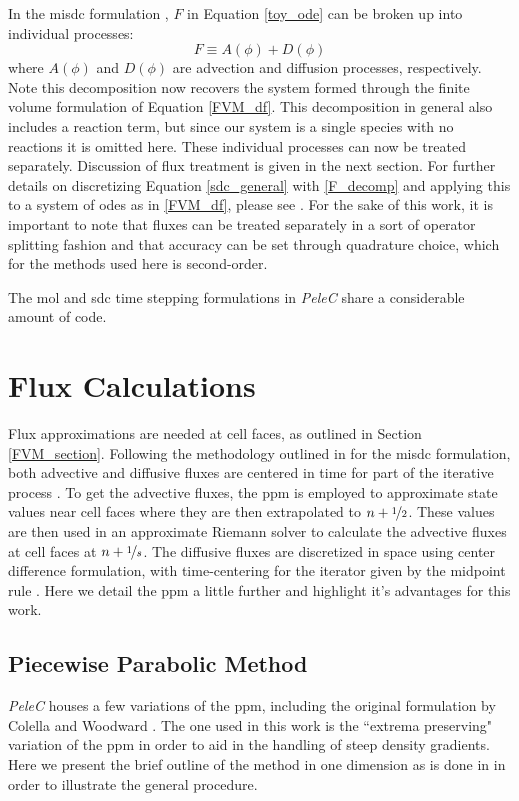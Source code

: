 In the \gls{misdc} formulation \cite{}, $F$ in Equation \ref{toy_ode} can be broken up into individual processes: 
\begin{equation} \label{F_decomp}
F \equiv A(\phi) + D(\phi)
\end{equation}
where $A(\phi)$ and $D(\phi)$ are advection and diffusion processes, respectively. Note this decomposition now recovers the system formed through the finite volume formulation of Equation \ref{FVM_df}. This decomposition in general also includes a reaction term, but since our system is a single species with no reactions it is omitted here. These individual processes can now be treated separately. Discussion of flux treatment is given in the next section. For further details on discretizing Equation \ref{sdc_general} with \ref{F_decomp} and applying this to a system of \gls{ode}s as in \ref{FVM_df}, please see \cite{}. For the sake of this work, it is important to note that fluxes can be treated separately in a sort of operator splitting fashion and that accuracy can be set through quadrature choice, which for the methods used here is second-order. 

The \gls{mol} and \gls{sdc} time stepping formulations in \textit{PeleC} share a considerable amount of code. 




\section{Flux Calculations}
Flux approximations are needed at cell faces, as outlined in Section \ref{FVM_section}. Following the methodology outlined in for the \gls{misdc} formulation, both advective and diffusive fluxes are centered in time for part of the iterative process \cite{}. To get the advective fluxes, the \gls{ppm} \cite{} is employed to approximate state values near cell faces where they are then extrapolated to $n+\nicefrac{1}{2}$. These values are then used in an approximate Riemann solver \cite{} to calculate the advective fluxes at cell faces at $n+\nicefrac{1}{s}$. The diffusive fluxes are discretized in space using center difference formulation, with time-centering for the iterator given by the midpoint rule \cite{}. Here we detail the \gls{ppm} a little further and highlight it's advantages for this work.
\subsection{Piecewise Parabolic Method}
\textit{PeleC} houses a few variations of the \gls{ppm}, including the original formulation by Colella and Woodward \cite{}. The one used in this work is the ``extrema preserving" variation of the \gls{ppm} \cite{} in order to aid in the handling of steep density gradients. Here we present the brief outline of the method in one dimension as is done in \cite{} in order to illustrate the general procedure. 

